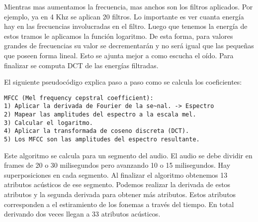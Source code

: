 
Mientras mas aumentamos la frecuencia, mas anchos son los filtros aplicados. Por ejemplo, ya en 4 Khz se aplican 20 filtros. Lo importante es ver cuanta energía hay en las frecuencias involucradas en el filtro. Luego que tenemos la energía de estos tramos le aplicamos la función logaritmo. De esta forma, para valores grandes de frecuencias su valor se decrementarán y no será igual que las pequeñas que poseen forma lineal. Esto se ajunta mejor a como escucha el oído. Para finalizar se computa DCT de las energías filtradas. 

El siguiente pseudocódigo explica paso a paso como se calcula los coeficientes:
\begin{lstlisting}
MFCC (Mel frequency cepstral coefficient):
1) Aplicar la derivada de Fourier de la se~nal. -> Espectro
2) Mapear las amplitudes del espectro a la escala mel.
3) Calcular el logaritmo.
4) Aplicar la transformada de coseno discreta (DCT).
5) Los MFCC son las amplitudes del espectro resultante.
\end{lstlisting}

Este algoritmo se calcula para un segmento del audio. El audio se debe dividir en frames de 20 o 30 milisegundos pero avanzando 10 o 15 milisegundos. Hay superposiciones en cada segmento. Al finalizar el algoritmo obtenemos 13 atributos acústicos de ese segmento. Podemos realizar la derivada de estos atributos y la segunda derivada para obtener más atributos. Estos atributos corresponden a el estiramiento de los fonemas a través del tiempo. En total derivando dos veces llegan a 33 atributos acústicos.

